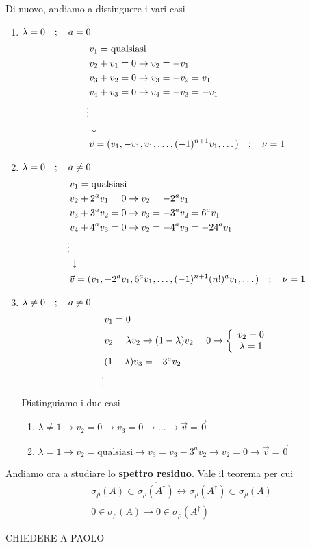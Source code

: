 Di nuovo, andiamo a distinguere i vari casi
\begin{enumerate}
	\item $\lambda = 0 \quad ; \quad a=0$
		\begin{align}
			&v_1 = \text{qualsiasi}\\
			&v_2 + v_1 = 0 \to v_2 = -v_1\\
			&v_3 + v_2 = 0 \to v_3 = -v_2 = v_1\\
			&v_4 + v_3 = 0 \to v_4 = -v_3 = -v_1\\
			\vdots \nonumber \\ &\downarrow \nonumber \\
			&\vec{v} = (v_1, -v_1 , v_1, \dots, (-1)^{n+1}v_1, \dots) \quad ; \quad \nu = 1
		\end{align}
		

	
	\item $\lambda = 0 \quad ; \quad a \neq 0$
		\begin{align}
			&v_1 = \text{qualsiasi}\\
			&v_2 + 2^a v_1 = 0 \to v_2 = -2^a v_1 \\
			&v_3 + 3^a v_2 = 0 \to v_3 = -3^a v_2 = 6^a v_1 \\
			&v_4 + 4^a v_3 = 0 \to v_2 = -4^a v_3 = -24^a v_1  \\
			\vdots \nonumber \\ &\downarrow \nonumber \\
			&\vec{v} = (v_1, -2^a v_1 ,6^a v_1, \dots, (-1)^{n+1} (n!)^a v_1, \dots) \quad ; \quad \nu = 1
		\end{align}
		


	\item $\lambda \neq 0 \quad ; \quad a \neq 0$
		\begin{align}
			&v_1 = 0\\
			&v_2 = \lambda v_2 \to (1 - \lambda)v_2 = 0 \to \left\{ \begin{array}{cc} v_2 = 0\\ \lambda = 1 \end{array} \right.\\
			&(1 - \lambda)v_3 = -3^a v_2\\ 
			\vdots \nonumber
		\end{align}
		Distinguiamo i due casi
		\begin{enumerate}
			\item $\lambda \neq 1 \to v_2 = 0 \to v_3 = 0 \to \dots \to \vec{v} = \vec{0}$
			\item $\lambda = 1 \to v_2 = \text{qualsiasi} \to v_3 = v_3 -3^a v_2 \to v_2 = 0 \to \vec{v} = \vec{0}$
		\end{enumerate}
\end{enumerate}

\newpage

Andiamo ora a studiare lo \textbf{spettro residuo}. Vale il teorema per cui
\begin{align}
	&\sigma_\rho (A) \subset \overline{\sigma_\rho (A^\dagger)} \leftrightarrow \sigma_\rho (A^\dagger) \subset \overline{\sigma_\rho (A)}\\
	&0 \in\sigma_\rho (A) \to 0 \in \overline{\sigma_\rho (A^\dagger)}
\end{align}

CHIEDERE A PAOLO
